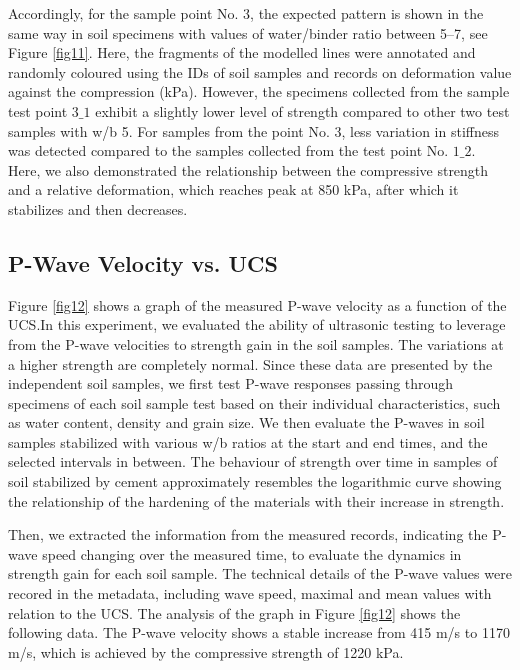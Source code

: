 \documentclass[sustainability,article,accept,pdftex,moreauthors]{Definitions/mdpi}
\begin{document}
{Accordingly, for {the} sample point No. 3, the expected pattern is shown in the same way in {soil }specimens with values of water/binder ratio between 5--7, see Figure \ref{fig11}. Here, the fragments of the modelled lines were annotated and randomly coloured using {the }IDs of soil samples and records on deformation value against {the }compression (kPa). However, the specimens collected from the sample test point $3\_1$ exhibit {a }slightly lower {level of }strength compared to other two test samples with w/b 5. For samples from the point No. 3, less variation in stiffness was detected compared to the samples collected from the test point No. $1\_2$. {Here,} we also demonstrated the relationship between the compressive strength and {a }relative deformation, which reaches peak at 850 kPa, after which {it }stabilizes and {then }decreases. 

\subsection{P-Wave Velocity vs. UCS}

Figure \ref{fig12} shows a graph of the measured P-wave velocity as a function of the UCS.\linebreak  In this experiment, we {evaluated} the ability of ultrasonic testing to leverage from {the }P-wave velocities to strength gain in {the }soil samples. %
The variations at a higher strength are completely normal. Since {these} data are {presented by the }independent soil samples, we first test P-wave responses passing through specimens of each soil sample test based on their individual characteristics, such as water content, density and grain size. We then evaluate the P-waves in soil samples stabilized with various w/b ratios at the start and end times, and the selected intervals in between. {The behaviour of strength over time in samples of soil stabilized by cement approximately resembles the logarithmic curve showing the relationship of the hardening of the materials with their increase in strength. }

Then, we {extracted the} information from {the }measured records, indicating {the }P-wave speed changing over {the }measured time, to evaluate the dynamics in strength gain for each {soil }sample. The technical details of the P-wave values were recored in {the }metadata, including wave speed, maximal and mean values with relation to the UCS. The analysis of the graph in Figure \ref{fig12} shows {the }following data. The P-wave velocity {shows} a stable increase from 415 m/s to 1170 m/s, which is achieved by {the }compressive strength of 1220 kPa.}
\end{document}
